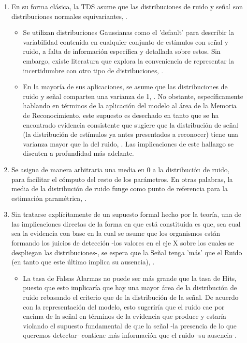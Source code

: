 \begin{enumerate}
\item En su forma clásica, la TDS asume que las distribuciones de ruido y señal son distribuciones normales equivariantes, \parencite{Stainslaw1999}.\\
  \begin{itemize}
  \item Se utilizan distribuciones Gaussianas como el 'default' para describir la variabilidad contenida en cualquier conjunto de estímulos con señal y ruido, a falta de información específica y detallada sobre estos. Sin embargo, existe literatura que explora la conveniencia de representar la incertidumbre con otro tipo de distribuciones, \parencite{Wickens, WeijiMa2009}.\\
  \item En la mayoría de sus aplicaciones, se asume que las distribuciones de ruido y señal comparten una varianza de 1, \parencite{Tanner1954}. No obstante, específicamente hablando en términos de la aplicación del modelo al área de la Memoria de Reconocimiento, este supuesto es desechado en tanto que se ha encontrado evidencia consistente que sugiere que la distribución de señal (la distribución de estímulos ya antes presentados a reconocer) tiene una varianza mayor que la del ruido, \parencite{Wixted2007}. Las implicaciones de este hallazgo se discuten a profundidad más adelante.\\
  \end{itemize}
\item Se asigna de manera arbitraria una media en 0 a la distribución de ruido, para facilitar el cómputo del resto de los parámetros. En otras palabras, la media de la distribución de ruido funge como punto de referencia para la estimación paramétrica, \parencite{Wickens, Gescheider}.\\
\item Sin tratarse explícitamente de un supuesto formal hecho por la teoría, una de las implicaciones directas de la forma en que está constituida es que, sea cual sea la evidencia con base en la cual se asume que los organismos están formando los juicios de detección -los valores en el eje X sobre los cuales se despliegan las distribuciones-, se espera que la Señal tenga 'más' que el Ruido (en tanto que este último implica su ausencia), \parencite{Stainslaw1999}.\\
  \begin{itemize}
  \item La tasa de Falsas Alarmas no puede ser más grande que la tasa de Hits, puesto que esto implicaría que hay una mayor área de la distribución de ruido rebasando el criterio que de la distribución de la señal. De acuerdo con la representación del modelo, esto sugeriría que el ruido cae por encima de la señal en términos de la evidencia que produce y estaría violando el supuesto fundamental de que la señal -la presencia de lo que queremos detectar- contiene más información que el ruido -su ausencia-.\\
  \end{itemize}
\end{enumerate}

